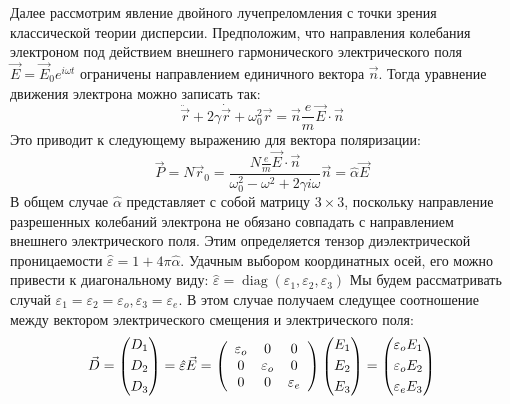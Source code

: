 \documentclass[a4paper,12pt]{article}
\begin{document}
Далее рассмотрим явление двойного лучепреломления с точки зрения классической теории дисперсии. Предположим, что направления колебания электроном под действием внешнего гармонического электрического поля $\vec E = \vec E_0 e^{i\omega t}$ ограничены направлением единичного вектора $\vec n$. Тогда уравнение движения электрона можно записать так: 
\[\ddot \vec r + 2\gamma \dot \vec r + \omega _0^2\vec r = \vec n\frac{e}{m}\vec E \cdot \vec n\]
Это приводит к следующему выражению для вектора поляризации: 
\[\vec P = N{{\vec r}_0} = \frac{{N\frac{e}{m}\vec E \cdot \vec n}}{{\omega _0^2 - {\omega ^2} + 2\gamma i\omega }}\vec n = \hat \alpha \vec E\]
В общем случае $\hat \alpha$ представляет с собой матрицу $3\times3$, поскольку направление разрешенных колебаний электрона не обязано совпадать с направлением внешнего электрического поля. Этим определяется тензор диэлектрической проницаемости $\hat \varepsilon = 1 + 4\pi\hat\alpha$. Удачным выбором координатных осей, его можно привести к диагональному виду: $\hat \varepsilon = \operatorname{diag} (\varepsilon_1, \varepsilon_2, \varepsilon_3)$
\newpage
Мы будем рассматривать случай $\varepsilon_1 = \varepsilon_2 = \varepsilon_o, \varepsilon_3 = \varepsilon_e$. В этом случае получаем следущее соотношение между вектором электрического смещения и электрического поля:
\[\vec D = \left( \begin{gathered}
{D_1} \hfill \\
{D_2} \hfill \\
{D_3} \hfill \\ 
\end{gathered}  \right) = \hat \varepsilon \vec E = \left( {\begin{array}{*{20}{c}}
	{{\varepsilon _o}}&0&0 \\ 
	0&{{\varepsilon _o}}&0 \\ 
	0&0&{{\varepsilon _e}} 
	\end{array}} \right)\left( \begin{gathered}
{E_1} \hfill \\
{E_2} \hfill \\
{E_3} \hfill \\ 
\end{gathered}  \right) = \left( \begin{gathered}
{\varepsilon _o}{E_1} \hfill \\
{\varepsilon _o}{E_2} \hfill \\
{\varepsilon _e}{E_3} \hfill \\ 
\end{gathered}  \right)\]
\end{document}
